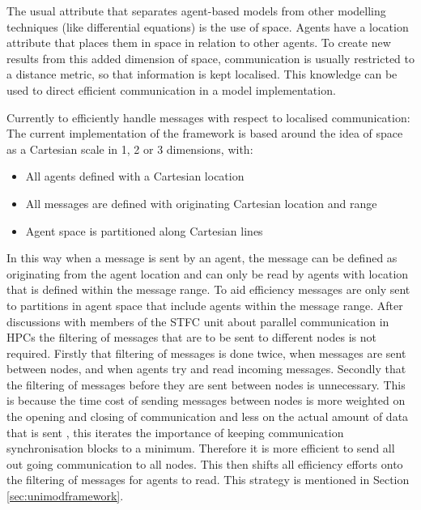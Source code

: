 \documentclass[a4paper,11pt]{article}
\begin{document}
The usual attribute that separates agent-based models from other modelling techniques (like differential equations) is the use of space. Agents have a location attribute that places them in space in relation to other agents. To create new results from this added dimension of space, communication is usually restricted to a distance metric, so that information is kept localised. This knowledge can be used to direct efficient communication in a model implementation.


Currently to efficiently handle messages with respect to localised communication:
The current implementation of the framework is based around the idea of space as a Cartesian scale in 1, 2 or 3 dimensions, with:

\begin{itemize}
\item All agents defined with a Cartesian location
\item All messages are defined with originating Cartesian location and range
\item Agent space is partitioned along Cartesian lines
\end{itemize}

In this way when a message is sent by an agent, the message can be defined as originating from the agent location and can only be read by agents with location that is defined within the message range. To aid efficiency messages are only sent to partitions in agent space that include agents within the message range. After discussions with members of the STFC unit about parallel communication in HPCs the filtering of messages that are to be sent to different nodes is not required. Firstly that filtering of messages is done twice, when messages are sent between nodes, and when agents try and read incoming messages. Secondly that the filtering of messages before they are sent between nodes is unnecessary. This is because the time cost of sending messages between nodes is more weighted on the opening and closing of communication and less on the actual amount of data that is sent \cite{HPCX:2003}, this iterates the importance of keeping communication synchronisation blocks to a minimum. Therefore it is more efficient to send all out going communication to all nodes. This then shifts all efficiency efforts onto the filtering of messages for agents to read. This strategy is mentioned in Section \ref{sec:unimodframework}.
\end{document}

